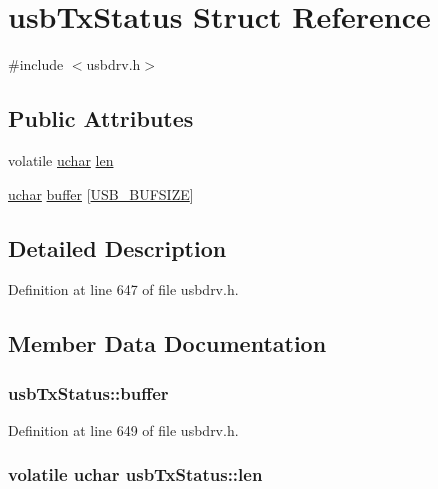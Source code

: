 \hypertarget{structusb_tx_status}{\section{usb\-Tx\-Status Struct Reference}
\label{structusb_tx_status}
}


{\ttfamily \#include $<$usbdrv.\-h$>$}

\subsection*{Public Attributes}
\begin{DoxyCompactItemize}
\item 
volatile \hyperlink{mhvlib-_vusb-_console_2vusb_2usbdrv_8h_aa8ddf20cdd716b652e76e23e5e700893}{uchar} \hyperlink{structusb_tx_status_a3ee6d00644cd8bb758bffffed53022b6}{len}
\item 
\hyperlink{mhvlib-_vusb-_console_2vusb_2usbdrv_8h_aa8ddf20cdd716b652e76e23e5e700893}{uchar} \hyperlink{structusb_tx_status_a02e966cd3ac205f8f7dab923d2d9c53d}{buffer} \mbox{[}\hyperlink{mhvlib-_vusb-_console_2vusb_2usbdrv_8h_a1c541dbab181ea7bd3da61b892430988}{U\-S\-B\-\_\-\-B\-U\-F\-S\-I\-Z\-E}\mbox{]}
\end{DoxyCompactItemize}


\subsection{Detailed Description}


Definition at line 647 of file usbdrv.\-h.



\subsection{Member Data Documentation}
\hypertarget{structusb_tx_status_a02e966cd3ac205f8f7dab923d2d9c53d}{
\subsubsection[{buffer}]{ usb\-Tx\-Status\-::buffer}}\label{structusb_tx_status_a02e966cd3ac205f8f7dab923d2d9c53d}


Definition at line 649 of file usbdrv.\-h.

\hypertarget{structusb_tx_status_a3ee6d00644cd8bb758bffffed53022b6}{
\subsubsection[{len}]{\setlength{\rightskip}{0pt plus 5cm}volatile {\bf uchar} usb\-Tx\-Status\-::len}}\label{structusb_tx_status_a3ee6d00644cd8bb758bffffed53022b6}


